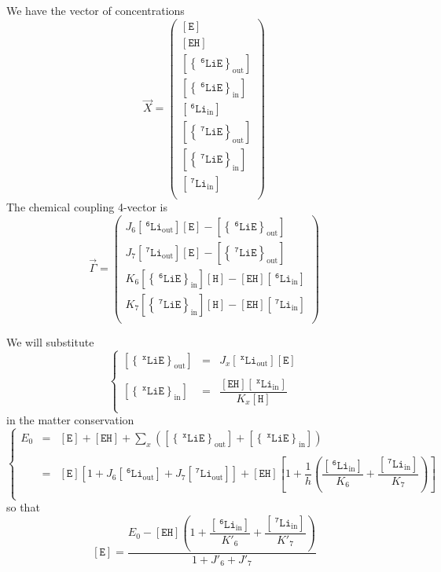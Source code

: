 \documentclass[aps,onecolumn,11pt]{revtex4}
\newcommand{\mychem}[1]{\mathtt{#1}}
\newcommand{\myconc}[1]{\left\lbrack{#1}\right\rbrack}
\newcommand{\spLi}[1]{{~^{\mychem{#1}}\mychem{Li}}}
\newcommand{\spEout}{\mychem{E}}
\newcommand{\Eout}{\myconc{\spEout}}
\newcommand{\spLiEin}[1]{\left\lbrace\spLi{#1}\spEout\right\rbrace_{\mathrm{in}}}
\newcommand{\LiEin}[1]{\myconc{\spLiEin{#1}}}
\newcommand{\spLiEout}[1]{\left\lbrace\spLi{#1}\spEout\right\rbrace_{\mathrm{out}}}
\newcommand{\LiEout}[1]{\myconc{\spLiEout{#1}}}
\newcommand{\spLiIn}[1]{{\spLi{#1}}_{\mathrm{in}}}
\newcommand{\LiIn}[1]{\myconc{\spLiIn{#1}}}
\newcommand{\spLiOut}[1]{{\spLi{#1}}_{\mathrm{out}}}
\newcommand{\LiOut}[1]{\myconc{\spLiOut{#1}}}
\newcommand{\spEHin}{\mychem{EH}}
\newcommand{\EHin}{\myconc{\spEHin}}
\newcommand{\spproton}{\mychem{H}}
\newcommand{\proton}{\myconc{\spproton}}
\begin{document}
We have the vector of concentrations
\begin{equation}
	\vec{X} = 
	\begin{pmatrix}
	\Eout\\
	\EHin\\
	\LiEout{6}\\
	\LiEin{6}\\
	\LiIn{6}\\
	\LiEout{7}\\
	\LiEin{7}\\
	\LiIn{7}\\
	\end{pmatrix}
\end{equation}
The chemical coupling 4-vector is
\begin{equation}
\vec{\Gamma} = 
\begin{pmatrix}
J_6 \LiOut{6} \Eout - \LiEout{6}\\
J_7 \LiOut{7} \Eout - \LiEout{7}\\
K_6 \LiEin{6}\proton - \EHin \LiIn{6}\\
K_7 \LiEin{7}\proton - \EHin \LiIn{7}\\
\end{pmatrix}
\end{equation}

We will substitute
\begin{equation}
\left\lbrace
\begin{array}{rcl}
	\LiEout{x} & = & J_x \LiOut{x} \Eout\\
	\\
	\LiEin{x}  & = & \dfrac{\EHin \LiIn{x}}{K_x\proton}\\
\end{array}
\right.
\end{equation}
in the matter conservation
\begin{equation}
\left\lbrace
\begin{array}{rcl}
	E_0 & = &\displaystyle \Eout + \EHin + \sum_x \left(\LiEout{x}+\LiEin{x}\right)\\
	\\
	& = & \Eout \left\lbrack1+J_6 \LiOut{6} + J_7 \LiOut{7}\right\rbrack + 
	\EHin 
	\left\lbrack
		1+\dfrac{1}{h}\left(\dfrac{\LiIn{6}}{K_6}+\dfrac{\LiIn{7}}{K_7}\right)
	\right\rbrack
	\\
\end{array}
\right.
\end{equation}
so that
\begin{equation}
	\Eout = \dfrac{E_0 - \EHin \left( 1 + \dfrac{\LiIn{6}}{K'_6} + \dfrac{\LiIn{7}}{K'_7}\right)}
	{1+J'_6+J'_7}
\end{equation}
\end{document}
